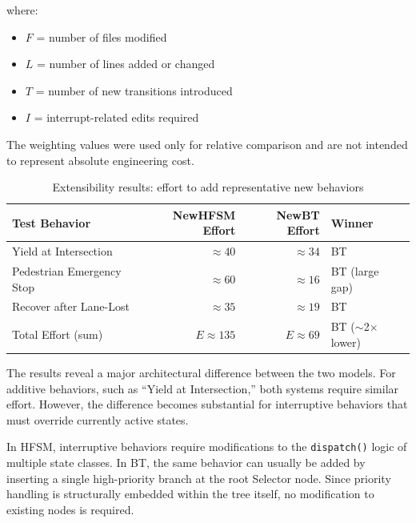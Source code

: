 \documentclass[12pt, a4paper]{report}
\begin{document}
where:

\begin{itemize}
    \item $F$ = number of files modified
    \item $L$ = number of lines added or changed
    \item $T$ = number of new transitions introduced
    \item $I$ = interrupt-related edits required
\end{itemize}

The weighting values were used only for relative comparison and are not intended to represent absolute engineering cost.

\begin{table}[H]
\centering
\caption{Extensibility results: effort to add representative new behaviors}
\label{tab:extensibility}
\begin{tabular}{@{}lrrl@{}}
\toprule
\textbf{Test Behavior} & \textbf{NewHFSM Effort} & \textbf{NewBT Effort} & \textbf{Winner} \\
\midrule
Yield at Intersection & $\approx 40$ & $\approx 34$ & BT \\
Pedestrian Emergency Stop & $\approx 60$ & $\approx 16$ & BT (large gap) \\
Recover after Lane-Lost & $\approx 35$ & $\approx 19$ & BT \\
\midrule
Total Effort (sum) & $E \approx 135$ & $E \approx 69$ & BT ($\sim$2$\times$ lower) \\
\bottomrule
\end{tabular}
\end{table}

The results reveal a major architectural difference between the two models. For additive behaviors, such as ``Yield at Intersection,'' both systems require similar effort. However, the difference becomes substantial for interruptive behaviors that must override currently active states.

In HFSM, interruptive behaviors require modifications to the \texttt{dispatch()} logic of multiple state classes. In BT, the same behavior can usually be added by inserting a single high-priority branch at the root Selector node. Since priority handling is structurally embedded within the tree itself, no modification to existing nodes is required.
\end{document}
